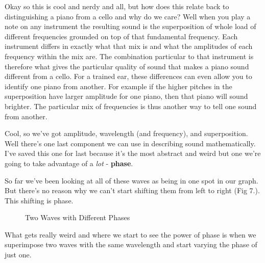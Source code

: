 \documentclass[10pt,a4paper]{article}
\begin{document}
Okay so this is cool and nerdy and all, but how does this relate back to distinguishing a piano from a cello and why do we care? Well when you play a note on any instrument the resulting sound is the superposition of whole load of different frequencies grounded on top of that fundamental frequency. Each instrument differs in exactly what that mix is and what the amplitudes of each frequency within the mix are. The combination particular to that instrument is therefore what gives the particular quality of sound that makes a piano sound different from a cello. For a trained ear, these differences can even allow you to identify one piano from another. For example if the higher pitches in the superposition have larger amplitude for one piano, then that piano will sound brighter. The particular mix of frequencies is thus another way to tell one sound from another.

Cool, so we've got amplitude, wavelength (and frequency), and superposition. Well there's one last component we can use in describing sound mathematically. I've saved this one for last because it's the most abstract and weird but one we're going to take advantage of a \textit{lot} - \textbf{phase}. 

So far we've been looking at all of these waves as being in one spot in our graph. But there's no reason why we can't start shifting them from left to right (Fig 7.). This shifting is phase. 

\begin{figure}[!htb]
\caption{\label{fig:my-label} Two Waves with Different Phases}
\end{figure}

What gets really weird and where we start to see the power of phase is when we superimpose two waves with the same wavelength and start varying the phase of just one. 
\end{document}
